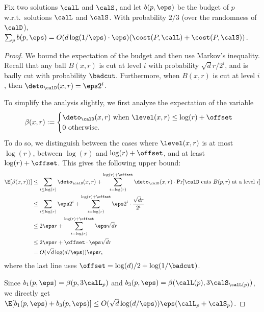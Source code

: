 \begin{lemma}\label{lem:budgetBoundedKmed}
Fix two solutions $\calL$ and $\calS$, and let $b(p, \eps)$ be the budget of $p$ w.r.t.\ solutions $\calL$ and $\calS$. With probability  $2/3$ (over the randomness of $\calD$),   $\sum_p b(p, \eps) = O(d \log(1/\eps) \cdot \eps) (\cost(P, \calL) + \cost(P, \calS))$.
\end{lemma}
\begin{proof}
 We bound the expectation of the budget and then use Markov's inequality. Recall that any ball $B(x, r)$ is cut at level $i$ with probability $\sqrt{d} r / 2^i$, and is  badly cut with probability $\badcut$. Furthermore, when $B(x, r)$  is cut at level $i$, then $\deto_\calD(x, r) = \eps 2^{i}$. 
 
 To simplify the analysis slightly, we first analyze the expectation of the variable 
\[\beta(x, r) := \begin{cases}\deto_\calD(x, r) \text{ when } \level(x, r) \leq \log(r) + \offset\\
 0 \text{ otherwise.}\end{cases}\]
 To do so, we distinguish between the cases where $\level(x, r)$ is at most $\log(r)$, between $\log(r)$ and $\log(r) + \offset$, and at least $\log(r) + \offset$. This gives the following upper bound:
 \begin{align*}
     \E[\beta(x, r))]
     &\leq \sum_{i \leq \log(r)} \deto_\calD(x, r) + \sum_{i = \log(r)}^{\log(r) + \offset} \deto_\calD(x, r) \cdot \Pr[\calD \text{ cuts } B(p,r) \text{ at a level } i]\\
     &\leq \sum_{i \leq \log(r)} \eps 2^{i} + \sum_{i = \log(r)}^{\log(r) + \offset}\eps 2^{i} \cdot \frac{\sqrt{d} r}{2^i}\\%
     &\leq 2 \eps r + \sum_{i = \log(r)}^{\log(r) + \offset} \eps \sqrt{d} r \\%
     &\leq 2\eps r + \offset \cdot \eps \sqrt{d} r\\%
     &= O(\sqrt{d}\log(d/\eps)) \eps r,
 \end{align*}
 where the last line uses $\offset =\log(d)/2 + \log(1/\badcut)$.


Since $b_1(p, \eps) = \beta(p, 3\calL_p)$ and $b_3(p, \eps) = \beta(\calL(p), 3\calS_{\calL(p)})$, we directly get $\E[b_1(p, \eps) + b_3(p, \eps)] \leq  O(\sqrt{d}\log(d/\eps)) \eps (\calL_p + \calS_p)$. 


\end{proof}
